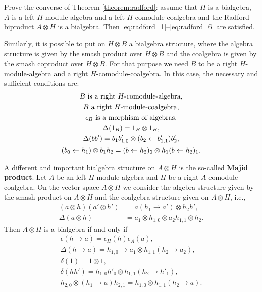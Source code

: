 \documentclass[12pt]{amsproc}
\begin{document}
\begin{exercise}
Prove the converse of Theorem \ref{theorem:radford}: assume that $H$ is a
bialgebra, $A$ is a left $H$-module-algebra and a left $H$-comodule coalgebra
and the Radford biproduct $A\otimes H$ is a bialgebra. Then
\eqref{eq:radford_1}--\eqref{eq:radford_6} are satisfied.
\end{exercise}


Similarly, it is possible to put on $H\otimes B$ a bialgebra structure, where
the algebra structure is given by the smash product over $H\otimes B$ and the
coalgebra is given by the smash coproduct over $H\otimes B$. For that purpose
we need $B$ to be a right $H$-module-algebra and a right
$H$-comodule-coalgebra. In this case, the necessary and sufficient conditions
are:
\begin{gather*}
B\text{ is a right \ensuremath{H}-comodule-algebra,}\\
B\text{ a right \ensuremath{H}-module-coalgebra,}\\
\epsilon_{B}\text{ is a morphism of algebras,}\\
\Delta(1_{B})=1_{B}\otimes1_{B},\\
\Delta(bb')=b_{1}b'_{1,0}\otimes(b_{2}\leftarrow b'_{1,1})b'_{2},\\
(b_{0}\leftarrow h_{1})\otimes b_{1}h_{2}=(b\leftarrow h_{2})_{0}\otimes h_{1}(b\leftarrow h_{2})_{1}.
\end{gather*}

A different and important bialgebra structure on $A\otimes H$ is
the so-called \textbf{Majid product}. Let $A$ be an left $H$-module-algebra
and $H$ be a right $A$-comodule-coalgebra. On the vector space $A\otimes H$
we consider the algebra structure given by the smash product on $A\otimes H$ and the coalgebra
structure given on $A\otimes H$, i.e.,
\begin{align*}
(a\otimes h)(a'\otimes h') & =a(h_{1}\rightarrow a')\otimes h_{2}h',\\
\Delta(a\otimes h) & =a_{1}\otimes h_{1,0}\otimes a_{2}h_{1,1}\otimes h_{2}.\end{align*}
Then $A\otimes H$ is a bialgebra if and only if \begin{gather*}
\epsilon(h\rightarrow a)=\epsilon_{H}(h)\epsilon_{A}(a),\\
\Delta(h\rightarrow a)=h_{1,0}\rightarrow a_{1}\otimes h_{1,1}(h_{2}\rightarrow a_{2}),\\
\delta(1)=1\otimes1,\\
\delta(hh')=h_{1,0}h'_{0}\otimes h_{1,1}(h_{2}\rightarrow h'_{1}),\\
h_{2,0}\otimes(h_{1}\rightarrow a)h_{2,1}=h_{1,0}\otimes h_{1,1}(h_{2}\rightarrow a).
\end{gather*}
\end{document}
